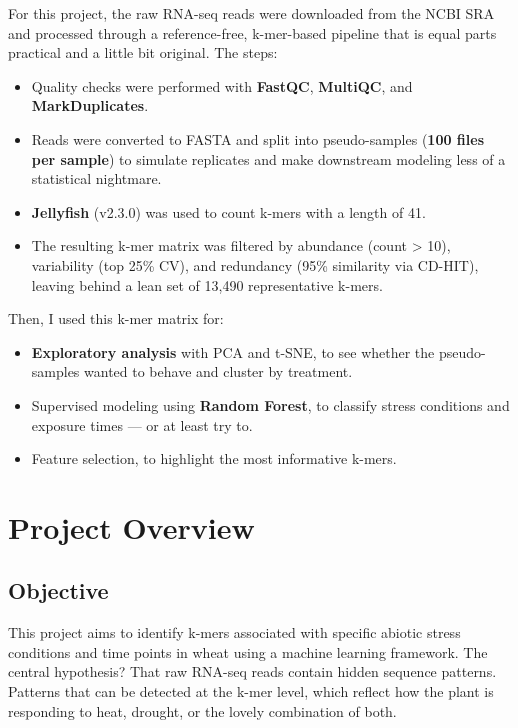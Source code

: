 \documentclass[
]{book}
\providecommand{\tightlist}{%
  \setlength{\itemsep}{0pt}\setlength{\parskip}{0pt}}
\begin{document}
For this project, the raw RNA-seq reads were downloaded from the NCBI SRA and processed through a reference-free, k-mer-based pipeline that is equal parts practical and a little bit original. The steps:

\begin{itemize}
\tightlist
\item
  Quality checks were performed with \textbf{FastQC}, \textbf{MultiQC}, and \textbf{MarkDuplicates}.
\item
  Reads were converted to FASTA and split into pseudo-samples (\textbf{100 files per sample}) to simulate replicates and make downstream modeling less of a statistical nightmare.
\item
  \textbf{Jellyfish} (v2.3.0) was used to count k-mers with a length of 41.
\item
  The resulting k-mer matrix was filtered by abundance (count \textgreater{} 10), variability (top 25\% CV), and redundancy (95\% similarity via CD-HIT), leaving behind a lean set of 13,490 representative k-mers.
\end{itemize}

Then, I used this k-mer matrix for:

\begin{itemize}
\tightlist
\item
  \textbf{Exploratory analysis} with PCA and t-SNE, to see whether the pseudo-samples wanted to behave and cluster by treatment.
\item
  Supervised modeling using \textbf{Random Forest}, to classify stress conditions and exposure times --- or at least try to.
\item
  Feature selection, to highlight the most informative k-mers.
\end{itemize}

\hypertarget{project-overview}{%
\section{Project Overview}\label{project-overview}}

\hypertarget{objective}{%
\subsection{Objective}\label{objective}}

This project aims to identify k-mers associated with specific abiotic stress conditions and time points in wheat using a machine learning framework. The central hypothesis? That raw RNA-seq reads contain hidden sequence patterns. Patterns that can be detected at the k-mer level, which reflect how the plant is responding to heat, drought, or the lovely combination of both.
\end{document}
